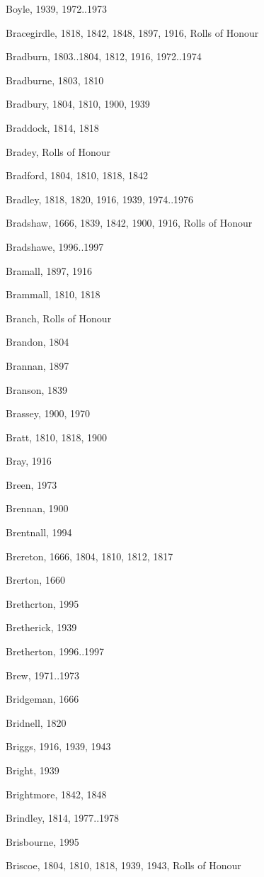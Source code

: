 \begin{theindex}
\item Boyle, 1939, 1972..1973
\item Bracegirdle, 1818, 1842, 1848, 1897, 1916, Rolls of Honour
\item Bradburn, 1803..1804, 1812, 1916, 1972..1974
\item Bradburne, 1803, 1810
\item Bradbury, 1804, 1810, 1900, 1939
\item Braddock, 1814, 1818
\item Bradey, Rolls of Honour
\item Bradford, 1804, 1810, 1818, 1842
\item Bradley, 1818, 1820, 1916, 1939, 1974..1976
\item Bradshaw, 1666, 1839, 1842, 1900, 1916, Rolls of Honour
\item Bradshawe, 1996..1997
\item Bramall, 1897, 1916
\item Brammall, 1810, 1818
\item Branch, Rolls of Honour
\item Brandon, 1804
\item Brannan, 1897
\item Branson, 1839
\item Brassey, 1900, 1970
\item Bratt, 1810, 1818, 1900
\item Bray, 1916
\item Breen, 1973
\item Brennan, 1900
\item Brentnall, 1994
\item Brereton, 1666, 1804, 1810, 1812, 1817
\item Brerton, 1660
\item Brethcrton, 1995
\item Bretherick, 1939
\item Bretherton, 1996..1997
\item Brew, 1971..1973
\item Bridgeman, 1666
\item Bridnell, 1820
\item Briggs, 1916, 1939, 1943
\item Bright, 1939
\item Brightmore, 1842, 1848
\item Brindley, 1814, 1977..1978
\item Brisbourne, 1995
\item Briscoe, 1804, 1810, 1818, 1939, 1943, Rolls of Honour

\end{theindex}
